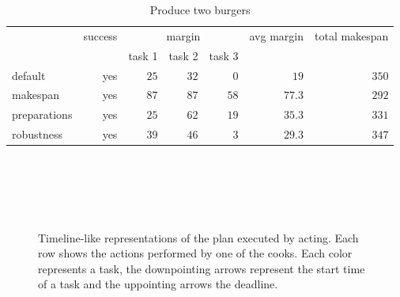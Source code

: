 \begin{table}
  \centering
  \begin{tabular}{lrrrrrr}
                & success & \multicolumn{3}{c}{margin}  & avg margin     & total makespan  \\
                &         &  task 1 & task 2  & task 3  &                &  \\ \hline
  default       & yes     & $25$    & $32$    &  $0$    & $19$           & $350$     \\
  makespan      & yes     & $87$    & $87$    &  $58$   & $77.3$         & $292$       \\
  preparations  & yes     & $25$    & $62$    &  $19$   & $35.3$         & $331$    \\
  robustness    & yes     & $39$    & $46$    &  $3$    & $29.3$         & $347$ \\
  \end{tabular}
  \caption{Produce two burgers}
  \label{tab:eval-acting}
\end{table}



\begin{figure}
  \centering
   \\\medskip
   \\\medskip
   \\\medskip
   \\\medskip
  \caption[]{Timeline-like representations of the plan executed by acting. Each row shows the actions performed by one of the cooks. Each color represents a task, the downpointing arrows represent the start time of a task and the uppointing arrows the deadline.}
  \label{fig:eval-acting}
\end{figure}
